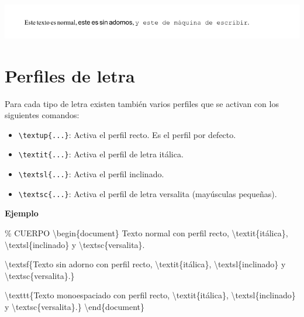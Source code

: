 \documentclass[
  a4paper,
]{scrreport}
\newenvironment{Shaded}{\begin{snugshade}}{\end{snugshade}}
\newcommand{\CommentTok}[1]{\textcolor[rgb]{0.37,0.37,0.37}{#1}}
\newcommand{\ExtensionTok}[1]{\textcolor[rgb]{0.00,0.23,0.31}{#1}}
\newcommand{\FunctionTok}[1]{\textcolor[rgb]{0.28,0.35,0.67}{#1}}
\newcommand{\KeywordTok}[1]{\textcolor[rgb]{0.00,0.23,0.31}{#1}}
\newcommand{\NormalTok}[1]{\textcolor[rgb]{0.00,0.23,0.31}{#1}}
\providecommand{\tightlist}{%
  \setlength{\itemsep}{0pt}\setlength{\parskip}{0pt}}\usepackage{longtable,booktabs,array}
\begin{document}
\begin{tcolorbox}[enhanced jigsaw, bottomrule=.15mm, leftrule=.75mm, opacityback=0, titlerule=0mm, bottomtitle=1mm, colbacktitle=quarto-callout-note-color!10!white, arc=.35mm, toprule=.15mm, colframe=quarto-callout-note-color-frame, title={Salida}, coltitle=black, colback=white, breakable, toptitle=1mm, rightrule=.15mm, left=2mm, opacitybacktitle=0.6]

\includegraphics{./img/formateo/tipos-letra-xelatex.png}

\end{tcolorbox}

\hypertarget{perfiles-de-letra}{%
\section{Perfiles de letra}\label{perfiles-de-letra}}

Para cada tipo de letra existen también varios perfiles que se activan
con los siguientes comandos:

\begin{itemize}
\tightlist
\item
  \texttt{\textbackslash{}textup\{...\}}: Activa el perfil recto. Es el
  perfil por defecto.
\item
  \texttt{\textbackslash{}textit\{...\}}: Activa el perfil de letra
  itálica.
\item
  \texttt{\textbackslash{}textsl\{...\}}: Activa el perfil inclinado.
\item
  \texttt{\textbackslash{}textsc\{...\}}: Activa el perfil de letra
  versalita (mayúsculas pequeñas).
\end{itemize}

\textbf{Ejemplo}

\begin{Shaded}
\begin{Highlighting}[]
\CommentTok{\% CUERPO}
\KeywordTok{\textbackslash{}begin}\NormalTok{\{}\ExtensionTok{document}\NormalTok{\}}
\NormalTok{Texto normal con perfil recto, }\FunctionTok{\textbackslash{}textit}\NormalTok{\{itálica\}, }\FunctionTok{\textbackslash{}textsl}\NormalTok{\{inclinado\} y }
\FunctionTok{\textbackslash{}textsc}\NormalTok{\{versalita\}.}

\FunctionTok{\textbackslash{}textsf}\NormalTok{\{Texto sin adorno con perfil recto, }\FunctionTok{\textbackslash{}textit}\NormalTok{\{itálica\}, }
\FunctionTok{\textbackslash{}textsl}\NormalTok{\{inclinado\} y }\FunctionTok{\textbackslash{}textsc}\NormalTok{\{versalita\}.\}}

\FunctionTok{\textbackslash{}texttt}\NormalTok{\{Texto monoespaciado con perfil recto, }\FunctionTok{\textbackslash{}textit}\NormalTok{\{itálica\}, }
\FunctionTok{\textbackslash{}textsl}\NormalTok{\{inclinado\} y }\FunctionTok{\textbackslash{}textsc}\NormalTok{\{versalita\}.\}}
\KeywordTok{\textbackslash{}end}\NormalTok{\{}\ExtensionTok{document}\NormalTok{\}}
\end{Highlighting}
\end{Shaded}
\end{document}
